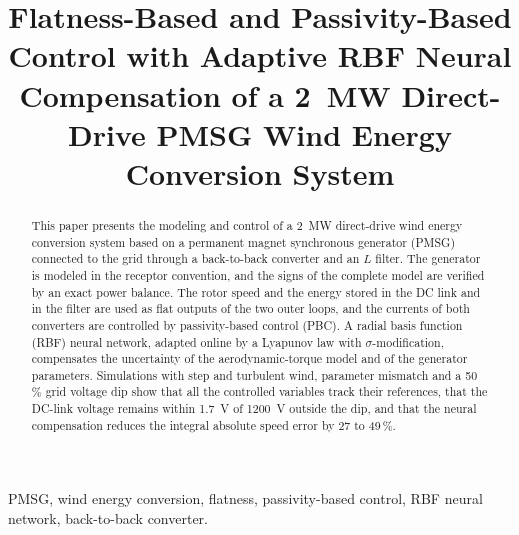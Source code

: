 \documentclass[conference]{IEEEtran}
\begin{document}
\title{Flatness-Based and Passivity-Based Control with Adaptive RBF Neural Compensation of a 2~MW Direct-Drive PMSG Wind Energy Conversion System}

\author{
\and
{}
\and
{}
}

\maketitle

\begin{abstract}
This paper presents the modeling and control of a 2~MW direct-drive wind energy conversion system
based on a permanent magnet synchronous generator (PMSG) connected to the grid through a back-to-back
converter and an $L$ filter. The generator is modeled in the receptor convention, and the signs of the
complete model are verified by an exact power balance. The rotor speed and the energy stored in the DC
link and in the filter are used as flat outputs of the two outer loops, and the currents of both
converters are controlled by passivity-based control (PBC). A radial basis function (RBF) neural
network, adapted online by a Lyapunov law with $\sigma$-modification, compensates the uncertainty of
the aerodynamic-torque model and of the generator parameters. Simulations with step and turbulent wind,
parameter mismatch and a 50\,\% grid voltage dip show that all the controlled variables track their
references, that the DC-link voltage remains within 1.7~V of 1200~V outside the dip, and that the
neural compensation reduces the integral absolute speed error by 27 to 49\,\%.
\end{abstract}

\begin{IEEEkeywords}
PMSG, wind energy conversion, flatness, passivity-based control, RBF neural network, back-to-back converter.
\end{IEEEkeywords}
\end{document}
